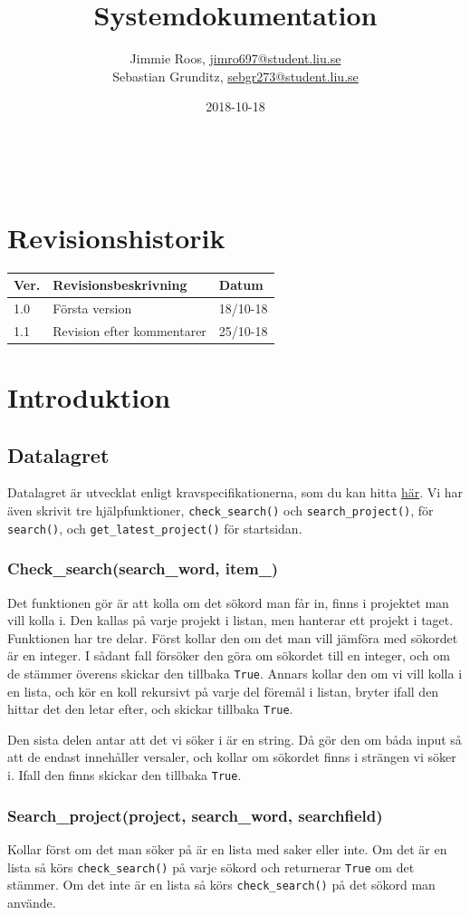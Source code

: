 \documentclass{TDP003mall}
\author{Jimmie Roos, \url{jimro697@student.liu.se}\\
Sebastian Grunditz, \url{sebgr273@student.liu.se}}
\title{Systemdokumentation}
\date{2018-10-18}
\begin{document}
\projectpage
\tableofcontents
⁠
\thispagestyle{empty}
\newpage
{}
\section*{Revisionshistorik}
\begin{table}[!h]
\begin{tabularx}{\linewidth}{|l|X|l|}
\hline
Ver. & Revisionsbeskrivning & Datum \\\hline
1.0 & Första version & 18/10-18 \\\hline
1.1 & Revision efter kommentarer & 25/10-18 \\\hline
\end{tabularx}
\end{table}

\section{Introduktion}
\subsection{Datalagret}
Datalagret är utvecklat enligt kravspecifikationerna, som du kan hitta \href{https://www.ida.liu.se/~TDP003/current/portfolio-api_python3/}{här}. Vi har även skrivit tre hjälpfunktioner, \texttt{check\_search()} och \texttt{search\_project()}, för \texttt{search()}, och \texttt{get\_latest\_project()} för startsidan.
\subsubsection{Check\_search(search\_word, item\_)}
Det funktionen gör är att kolla om det sökord man får in, finns i projektet man vill kolla i. Den kallas på varje projekt i listan, men hanterar ett projekt i taget.
Funktionen har tre delar. Först kollar den om det man vill jämföra med sökordet är en integer. I sådant fall försöker den göra om sökordet till en integer, och om de stämmer
överens skickar den tillbaka \texttt{True}. Annars kollar den om vi vill kolla i en lista, och kör en koll rekursivt på varje del föremål i listan, bryter ifall den hittar det
den letar efter, och skickar tillbaka \texttt{True}.

Den sista delen antar att det vi söker i är en string. Då gör den om båda input så att de endast innehåller versaler, och kollar om sökordet finns i strängen vi söker i. Ifall den finns skickar den tillbaka \texttt{True}.
\subsubsection{Search\_project(project, search\_word, searchfield)}
Kollar först om det man söker på är en lista med saker eller inte. Om det är en lista så körs \texttt{check\_search()} på varje sökord och returnerar \texttt{True} om det stämmer.
Om det inte är en lista så körs \texttt{check\_search()} på det sökord man använde.
\end{document}
